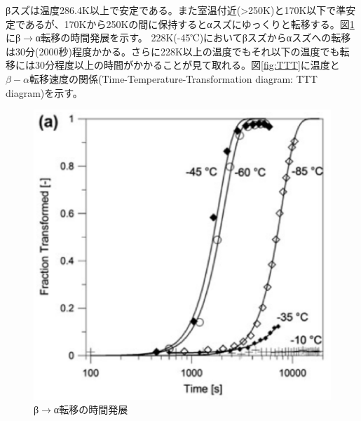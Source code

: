 βスズは温度286.4K以上で安定である。また室温付近(>250K)と170K以下で準安定であるが、170Kから250Kの間に保持するとαスズにゆっくりと転移する。図\ref{fig:beta-to-alpha}にβ$\to$α転移の時間発展を示す\cite{Nogita}。
228K(-45℃)においてβスズからαスズへの転移は30分(2000秒)程度かかる。さらに228K以上の温度でもそれ以下の温度でも転移には30分程度以上の時間がかかることが見て取れる。図\ref{fig:TTT}に温度と$\beta-\alpha$転移速度の関係(Time-Temperature-Transformation diagram: TTT diagram)を示す。
\begin{figure}[!h]
 \begin{minipage}{0.5\hsize}
    \begin{center}
   \includegraphics[width=\hsize]{Introduction/beta-to-alpha.eps}
  \end{center}
  \caption{β$\to$α転移の時間発展\cite{Nogita}}
  \label{fig:beta-to-alpha}
 \end{minipage}
  \begin{minipage}{0.5\hsize}
     \begin{center}

\end{center}
\end{minipage}
\end{figure}
